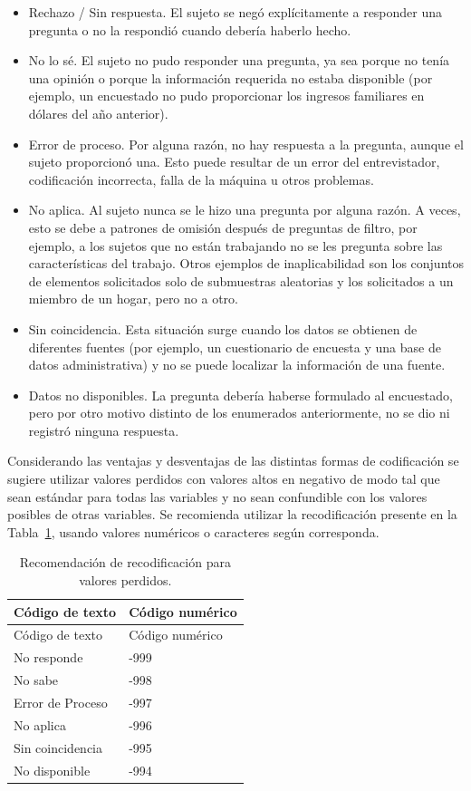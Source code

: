 \documentclass[
  spanish,
  a4paper,
  oneside]{scrbook}
\begin{document}
\begin{itemize}
\item
  Rechazo / Sin respuesta. El sujeto se negó explícitamente a responder
  una pregunta o no la respondió cuando debería haberlo hecho.
\item
  No lo sé. El sujeto no pudo responder una pregunta, ya sea porque no
  tenía una opinión o porque la información requerida no estaba
  disponible (por ejemplo, un encuestado no pudo proporcionar los
  ingresos familiares en dólares del año anterior).
\item
  Error de proceso. Por alguna razón, no hay respuesta a la pregunta,
  aunque el sujeto proporcionó una. Esto puede resultar de un error del
  entrevistador, codificación incorrecta, falla de la máquina u otros
  problemas.
\item
  No aplica. Al sujeto nunca se le hizo una pregunta por alguna razón. A
  veces, esto se debe a patrones de omisión después de preguntas de
  filtro, por ejemplo, a los sujetos que no están trabajando no se les
  pregunta sobre las características del trabajo. Otros ejemplos de
  inaplicabilidad son los conjuntos de elementos solicitados solo de
  submuestras aleatorias y los solicitados a un miembro de un hogar,
  pero no a otro.
\item
  Sin coincidencia. Esta situación surge cuando los datos se obtienen de
  diferentes fuentes (por ejemplo, un cuestionario de encuesta y una
  base de datos administrativa) y no se puede localizar la información
  de una fuente.
\item
  Datos no disponibles. La pregunta debería haberse formulado al
  encuestado, pero por otro motivo distinto de los enumerados
  anteriormente, no se dio ni registró ninguna respuesta.
\end{itemize}

Considerando las ventajas y desventajas de las distintas formas de
codificación se sugiere utilizar valores perdidos con valores altos en
negativo de modo tal que sean estándar para todas las variables y no
sean confundible con los valores posibles de otras variables. Se
recomienda utilizar la recodificación presente en la
Tabla~\ref{tbl-tabna}, usando valores numéricos o caracteres según
corresponda.

\begin{longtable}[]{@{}ll@{}}
\caption{Recomendación de recodificación para valores
perdidos.}\label{tbl-tabna}\tabularnewline
\toprule\noalign{}
Código de texto & Código numérico \\
\midrule\noalign{}
\endfirsthead
\toprule\noalign{}
Código de texto & Código numérico \\
\midrule\noalign{}
\endhead
\bottomrule\noalign{}
\endlastfoot
No responde & -999 \\
No sabe & -998 \\
Error de Proceso & -997 \\
No aplica & -996 \\
Sin coincidencia & -995 \\
No disponible & -994 \\
\end{longtable}
\end{document}
